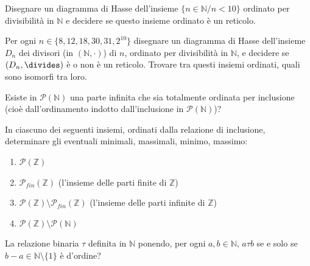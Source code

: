 \begin{exsbox}
	Disegnare un diagramma di Hasse dell'insieme $\{n \in \mathbb{N} / n <10\}$ ordinato per divisibilità in $\mathbb{N}$ e decidere se questo insieme ordinato è un reticolo.
\end{exsbox}
\begin{exsbox}
	Per ogni $n \in \{8,12,18,30,31,2^{10}\}$ disegnare un diagramma di Hasse dell'insieme $D_{n}$ dei divisori (in $(\mathbb{N},\cdot)$) di $n$, ordinato per divisibilità in $\mathbb{N}$, e decidere se $(D_{n},\divides)$ è o non è un reticolo. Trovare tra questi insiemi ordinati, quali sono isomorfi tra loro.
\end{exsbox}
\begin{exsbox}
	Esiste in $\mathcal{P}(\mathbb{N})$ una parte infinita che sia totalmente ordinata per inclusione (cioè dall'ordinamento indotto dall'inclusione in $\mathcal{P}(\mathbb{N})$)?
\end{exsbox}
\begin{exsbox}
	In ciascuno dei seguenti insiemi, ordinati dalla relazione di inclusione, determinare gli eventuali minimali, massimali, minimo, massimo:
	\begin{enumerate}
		\item $\mathcal{P}(\mathbb{Z})$
		\item $\mathcal{P}_{fin}(\mathbb{Z})$ (l'insieme delle parti finite di $\mathbb{Z}$)
		\item $\mathcal{P}(\mathbb{Z})\setminus \mathcal{P}_{fin}(\mathbb{Z})$ (l'insieme delle parti infinite di $\mathbb{Z}$)
		\item $\mathcal{P}(\mathbb{Z}) \setminus \mathcal{P}(\mathbb{N})$
	\end{enumerate}
\end{exsbox}
\begin{exsbox}
	La relazione binaria $\tau$ definita in $\mathbb{N}$ ponendo, per ogni $a,b \in \mathbb{N}$, $a \tau b$ se e solo se $b−a \in \mathbb{N} \setminus\{1\}$ è d'ordine?
\end{exsbox}

